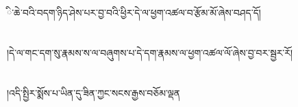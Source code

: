ི་ཆེ་བའི་བདག་ཉིད་ཤེས་པར་བྱ་བའི་ཕྱིར་དེ་ལ་ཕྱག་འཚལ་བ་རྩོམ་མོ་ཞེས་བཤད་དོ།\chapter{ }།དེ་ལ་གང་དག་སུ་རྣམས་ས་ལ་བཞུགས་པ་དེ་དག་རྣམས་ལ་ཕྱག་འཚལ་ལོ་ཞེས་བྱ་བར་སྦྱར་རོ།\chapter{ }།འདི་སྤྱིར་སྨོས་པ་ཡིན་དུ་ཟིན་ཀྱང་སངས་རྒྱས་བཅོམ་ལྡན
